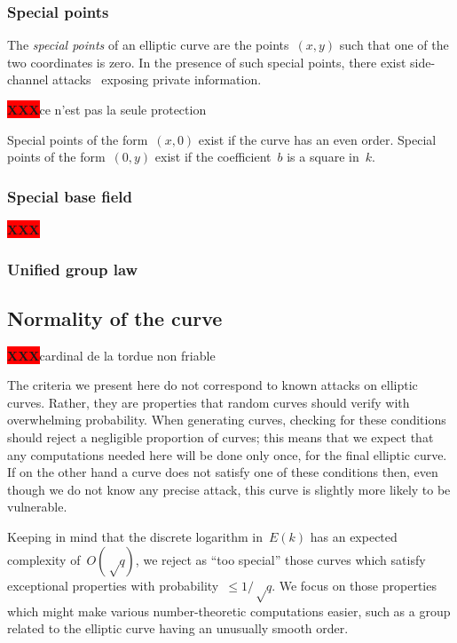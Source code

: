 \documentclass{article}
\def\XXX{{\colorbox{red}{{\color{white}\bfseries XXX}}}}
\begin{document}
\subsubsection{Special points}
\label{sss:special-points}

The \emph{special points} of an elliptic curve
are the points~$(x,y)$ such that one of the two coordinates is zero.
In the presence of such special points,
there exist side-channel attacks~\cite{pkc2003goubin}
exposing private information.

\XXX ce n'est pas la seule protection

Special points of the form~$(x, 0)$ exist if the curve has
an even order.
Special points of the form~$(0, y)$ exist if the coefficient~$b$
is a square in~$k$.

\subsubsection{Special base field}
\label{sss:special-side}

\XXX

\subsubsection{Unified group law}
\label{sss:unified}

\subsection{Normality of the curve}
\label{ss:normal}

\XXX cardinal de la tordue non friable

The criteria we present here do not correspond to
known attacks on elliptic curves.
Rather, they are properties that random curves should verify
with overwhelming probability.
When generating curves, checking for these conditions
should reject a negligible proportion of curves;
this means that we expect that any computations needed here
will be done only once, for the final elliptic curve.
If on the other hand a curve does not satisfy one of these conditions
then, even though we do not know any precise attack,
this curve is slightly more likely to be vulnerable.

Keeping in mind that the discrete logarithm in~$E(k)$
has an expected complexity of~$O(√q)$,
we reject as ``too special'' those curves
which satisfy exceptional properties with probability~$≤ 1/√q$.
We focus on those properties which might make
various number-theoretic computations easier,
such as a group related to the elliptic curve
having an unusually smooth order.
\end{document}
